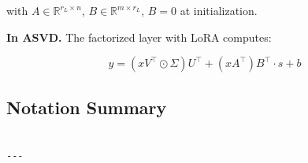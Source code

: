 with $A \in \mathbb{R}^{r_L \times n}$, $B \in \mathbb{R}^{m \times r_L}$, 
$B = 0$ at initialization.

\textbf{In ASVD.} The factorized layer with LoRA computes:

\begin{equation}
y = (x V^\top \odot \Sigma) U^\top + (x A^\top) B^\top \cdot s + b
\end{equation}

\subsection{Notation Summary}

\begin{lstlisting}

---
\end{lstlisting}